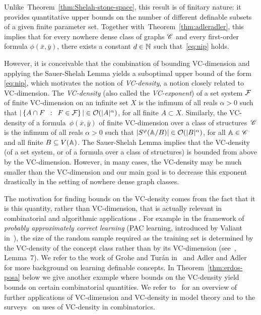 Unlike~Theorem~\ref{thm:Shelah-stone-space}, this result is of
finitary nature: it provides quantitative upper bounds on the number
of different definable subsets of a given finite parameter set.
Together with~Theorem~\ref{thm:adleradler}, this implies that for
every nowhere dense class of graphs $\CCC $ and every first-order
formula $\phi(\bar x,\bar y)$, there exists a constant $d\in\N$ such
that~\eqref{eq:nip} holds.

However, it is conceivable that the combination of bounding
VC-dimension and applying the Sauer-Shelah Lemma yields a suboptimal
upper bound of the form \eqref{eq:nip}, which motivates the notion of
\emph{VC-density}, a notion closely related to VC-dimension. The
\emph{VC-density} (also called the \emph{VC-exponent}) of a set system
$\cal F$ of finite VC-dimension on an infinite set $X$ is the infimum
of all reals $\alpha>0$ such that
$|\setof{A\cap F}{F\in \cal F}|\in \Oof(|A|^\alpha)$, for all finite
$A\subset X$.  Similarly, the VC-density of a
formula~$\phi(\bar x,\bar y)$ of finite VC-dimension over a class of
structures~$\CCC$ is the infimum of all reals $\alpha>0$ such that
$|S^\phi(\str A/B)|\in \Oof(|B|^\alpha)$, for all $\str A\in \CCC $
and all finite $B\subset V(\str A)$.  The Sauer-Shelah Lemma implies
that the VC-density (of a set system, or of a formula over a class of
structures) is bounded from above by the VC-dimension.  However, in
many cases, the VC-density may be much smaller than the VC-dimension
and our main goal is to decrease this exponent drastically in the
setting of nowhere dense graph classes.

The motivation for finding bounds on the VC-density comes from the
fact that it is this quantity, rather than VC-di\-men\-sion, that is
actually relevant in combinatorial and algorithmic applications
\cite{Bronnimann1995,matouvsek1998geometric,Matousek:2004:BVI:1005787.1005789,chervonenkis1971theory,blumer1989learnability}. %
For example in the framework of \emph{probably approximately correct
  learning} (PAC learning, introduced by Valiant
in~\cite{valiant1984theory}), the size of the random sample required
as the training set is determined by the VC-density of the concept
class rather than by its VC-dimension
(see~\cite{blumer1989learnability}, Lemma~7).  We refer to the work of
Grohe and Tur\'an in~\cite{grohe2004learnability} and Adler and
Adler~\cite{adler2014interpreting} for more background on learning
definable concepts.  In Theorem~\ref{thm:erdos-posa} below we give
another example where bounds on the VC-density yield bounds on certain
combinatorial quantities.  We refer to~\cite{aschenbrenner2016vapnik}
for an overview of further applications of VC-dimension and VC-density
in model theory and to the
surveys~\cite{furedi1991traces,matouvsek1998geometric} on uses of
VC-density in combinatorics.

